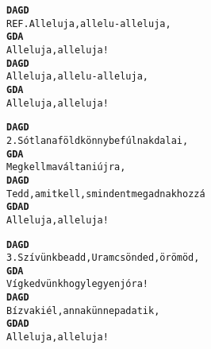\newpage
{}
\kottastart
{}
\kottaend
\begin{minipage}{\textwidth}
\begin{multicols}{2}
\begin{minipage}{\textwidth}
\begin{alltt}
\textbf{     D      A  G             D}
REF. Alleluja, allelu-alleluja,
\textbf{     G      D         A}
     Alleluja, alleluja!
\textbf{     D      A  G             D}
     Alleluja, allelu-alleluja,
\textbf{     G      D         A}
     Alleluja, alleluja!
\end{alltt}
\vspace{0.0cm}
\versszakspacing
\end{minipage}
\begin{minipage}{\textwidth}
\begin{alltt}
\textbf{   D         A            G         D}
2. Sótlan a föld könnybe fúlnak dalai,
\textbf{   G            D      A}
   Meg kell ma váltani újra,
\textbf{   D           A               G           D}
   Tedd, amit kell, s mindent megadnak hozzá
\textbf{    G     D  A      D}
   Alleluja, alleluja!
\end{alltt}
\vspace{0.0cm}
\versszakspacing
\end{minipage}
\begin{minipage}{\textwidth}
\begin{alltt}
\textbf{   D          A          G          D}
3. Szívünkbe add, Uram csönded, örömöd,
\textbf{   G            D           A}
   Víg kedvünk hogy legyen jóra!
\textbf{   D        A         G         D}
   Bízva ki él, annak ünnep adatik,
\textbf{   G      D   A     D}
   Alleluja, alleluja!
\end{alltt}
\vspace{0.0cm}
\versszakspacing
\end{minipage}
\vspace{0.2cm}
\end{multicols}
\end{minipage}

